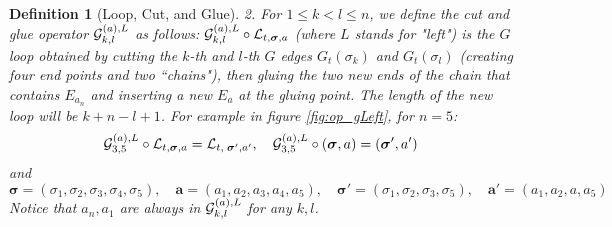 \documentclass[10pt,reqno]{article}
\theoremstyle{plain} %
\newtheorem{definition}[theorem]{Definition}
\theoremstyle{remark}
\numberwithin{equation}{section}
\begin{document}
\begin{definition}[Loop, Cut, and Glue]
 \noindent 
 \emph{2.}  For $1 \le k < l \le n$, we define the cut and glue operator ${\cal G}^{(a), L}_{k, l}$ as follows: ${\cal G}^{(a), L}_{k, l} \circ {\cal L}_{t, \boldsymbol{\sigma}, \textbf{a}}$ (where $L$ stands for "left") is the $G$ loop obtained by cutting the $k$-th and $l$-th $G$ edges $G_t(\sigma_k)$ and $G_t(\sigma_l)$ (creating four end points and two ``chains"), then gluing the two new ends of the chain that contains $E_{a_n}$ and inserting a new $E_a$ at the gluing point. The length of the new loop will be $k + n - l + 1$. For example in figure \ref{fig:op_gLeft}, for $n=5$:
    $$
    {\cal G}^{(a), L}_{3, 5} \circ {\cal L}_{t, \boldsymbol{\sigma}, \textbf{a}} = {\cal L}_{t, \; \boldsymbol{\sigma}', \textbf{a}'}, \quad 
     {\cal G}^{(a), L}_{3, 5}\circ\left(\boldsymbol{\sigma}, \textbf{a}\right)=\left(\boldsymbol{\sigma}', \textbf{a}'\right)
    $$
and 
$$ \boldsymbol{\sigma}=(\sigma_1,\sigma_2,\sigma_3,\sigma_4,\sigma_5),\quad 
   \textbf{a}= (a_1,a_2,a_3,a_4,a_5),\quad \boldsymbol{\sigma}' = (\sigma_1, \sigma_2, \sigma_3, \sigma_5), \quad \textbf{a}' = (a_1, a_2, a, a_5)
$$
  Notice that $a_n, a_1$ are always in ${\cal G}^{(a), L}_{k, l}$ for any $k, l$.  

    
    \begin{figure}[ht]
        \centering
\end{figure}
\end{definition}
\end{document}
